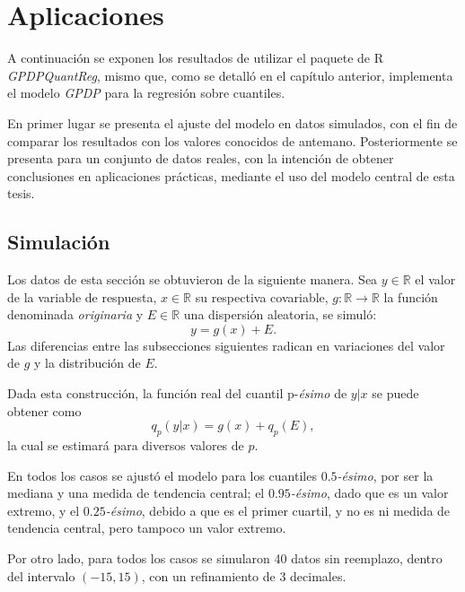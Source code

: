 \chapter[Aplicaciones]{Aplicaciones}

A continuaci\'on se exponen los resultados de utilizar el paquete de R \textit{GPDPQuantReg}, mismo que, como se detalló en el cap\'itulo anterior, implementa el modelo \textit{GPDP} para la regresi\'on sobre cuantiles.

En primer lugar se presenta el ajuste del modelo en datos simulados, con el fin de comparar los resultados con los valores conocidos de antemano. Posteriormente se presenta para un conjunto de datos reales, con la intenci\'on de obtener conclusiones en aplicaciones pr\'acticas, mediante el uso del modelo central de esta tesis.

\section{Simulaci\'on}

Los datos de esta secci\'on se obtuvieron de la siguiente manera. Sea $y \in \mathbb{R}$ el valor de la variable de respuesta, $x \in \mathbb{R}$ su respectiva covariable, $g: \mathbb{R} \rightarrow \mathbb{R}$ la funci\'on denominada \textit{originaria} y $E \in \mathbb{R}$ una dispersi\'on aleatoria, se simul\'o:
\begin{equation*}
    y = g(x) + E.
\end{equation*}
Las diferencias entre las subsecciones siguientes radican en variaciones del valor de $g$ y la distribuci\'on de $E$.

Dada esta construcci\'on, la funci\'on real del cuantil p-\textit{\'esimo} de $y|x$ se puede obtener como
\begin{equation*}
    q_p(y|x) = g(x) + q_p(E),
\end{equation*}
la cual se estimar\'a para diversos valores de $p$.

En todos los casos se ajust\'o el modelo para los cuantiles $0.5$\textit{-\'esimo}, por ser la mediana y una medida de tendencia central; el $0.95$\textit{-\'esimo}, dado que es un valor extremo, y el $0.25$\textit{-\'esimo}, debido a que es el primer cuartil, y no es ni medida de tendencia central, pero tampoco un valor extremo.

Por otro lado, para todos los casos se simularon 40 datos sin reemplazo, dentro del intervalo $(-15,15)$, con un refinamiento de 3 decimales.

